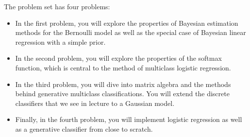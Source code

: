 \documentclass[submit]{harvardml}
\begin{document}
The problem set has four problems: 
\begin{itemize}
\item In the first problem, you will explore the properties of Bayesian
estimation methods for the Bernoulli model as well as the special
case of Bayesian linear regression with a simple prior.
%
\item In the second problem, you will explore the properties of the softmax
function, which is central to 
the method of
multiclass logistic regression. 
%
\item  In the third
problem, you will dive into  matrix algebra and the methods behind
generative multiclass classifications. You will extend the discrete classifiers  
that we see in  lecture to a Gaussian model.
%
\item Finally, in the fourth problem, you will implement 
 logistic regression as well as a generative classifier 
from close to scratch.
%
\end{itemize}
\end{document}

